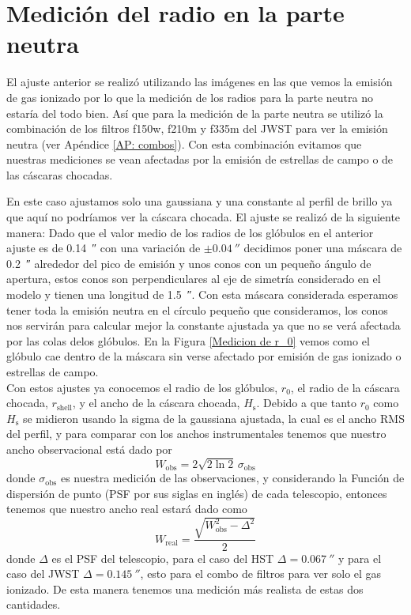 \documentclass{book}
\begin{document}
\section{Medición del radio en la parte neutra} \label{Sec : radio neutro}

El ajuste anterior se realizó utilizando las imágenes en las que vemos la emisión de gas ionizado por lo que la medición de los radios para la parte neutra no estaría del todo bien. Así que para la medición de la parte neutra se utilizó la combinación de los filtros f150w, f210m y f335m del JWST para ver la emisión neutra (ver Apéndice \ref{AP: combos}). Con esta combinación evitamos que nuestras mediciones se vean afectadas por la emisión de estrellas de campo o de las cáscaras chocadas.

En este caso ajustamos solo una gaussiana y una constante al perfil de brillo ya que aquí no podríamos ver la cáscara chocada. El ajuste se realizó de la siguiente manera: Dado que el valor medio de los radios de los glóbulos en el anterior ajuste es de  \SI{0.14}{\arcsecond} con una variación de $\pm\SI{0.04}{\arcsecond}$ decidimos poner una máscara de \SI{0.2}{\arcsecond} alrededor del pico de emisión y unos conos con un pequeño ángulo de apertura, estos conos son perpendiculares al eje de simetría considerado en el modelo y tienen una longitud de \SI{1.5}{\arcsecond}. Con esta máscara considerada esperamos tener toda la emisión neutra en el círculo pequeño que consideramos, los conos nos servirán para calcular mejor la constante ajustada ya que no se verá afectada por las colas delos glóbulos. En la Figura \ref{Medicion de r_0} vemos como el glóbulo cae dentro de la máscara sin verse afectado por emisión de gas ionizado o estrellas de campo. \\

Con estos ajustes ya conocemos el radio de los glóbulos, $r_0$, el radio de la cáscara chocada, $r_\mathrm{shell}$, y el ancho de la cáscara chocada, $H_\mathrm{s}$.  
Debido a que tanto  $r_0$ como  $H_\mathrm{s}$ se midieron usando la sigma de la gaussiana ajustada, la cual es el ancho RMS del perfil, y para comparar con los anchos instrumentales tenemos que nuestro ancho observacional está dado por
\begin{equation}
    W_\mathrm{obs}= 2\sqrt{2\ln{2}} \, \sigma_\mathrm{obs}
\end{equation}
donde $\sigma_\mathrm{obs}$ es nuestra medición de las observaciones, y considerando la Función de dispersión de punto (PSF por sus siglas en inglés) de cada telescopio, entonces tenemos que nuestro ancho real estará dado como
\begin{equation}
    W_\mathrm{real} = \frac{\sqrt{W_\mathrm{obs}^2-\Delta^2}}{2}
\end{equation}
donde $\Delta$ es el PSF del telescopio, para el caso del HST $\Delta=\SI{0.067}{\arcsecond}$ y para el caso del JWST $\Delta=\SI{0.145}{\arcsecond}$, esto para el combo de filtros para ver solo el gas ionizado. De esta manera tenemos una medición más realista de estas dos cantidades.
\end{document}
